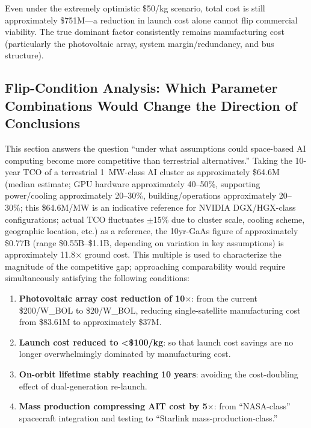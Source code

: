 Even under the extremely optimistic \$50/kg scenario, total cost is still approximately \$751M---a reduction in launch cost alone cannot flip commercial viability. The true dominant factor consistently remains manufacturing cost (particularly the photovoltaic array, system margin/redundancy, and bus structure).

\subsection{Flip-Condition Analysis: Which Parameter Combinations Would Change the Direction of Conclusions}

This section answers the question ``under what assumptions could space-based AI computing become more competitive than terrestrial alternatives.'' Taking the 10-year TCO of a terrestrial 1~MW-class AI cluster as approximately \$64.6M (median estimate; GPU hardware approximately 40--50\%, supporting power/cooling approximately 20--30\%, building/operations approximately 20--30\%; this \$64.6M/MW is an indicative reference for NVIDIA DGX/HGX-class configurations; actual TCO fluctuates $\pm$15\% due to cluster scale, cooling scheme, geographic location, etc.) as a reference, the 10yr-GaAs figure of approximately \$0.77B (range \$0.55B--\$1.1B, depending on variation in key assumptions) is approximately 11.8$\times$ ground cost. This multiple is used to characterize the magnitude of the competitive gap; approaching comparability would require simultaneously satisfying the following conditions:

\begin{enumerate}[leftmargin=*]
    \item \textbf{Photovoltaic array cost reduction of 10$\times$}: from the current \$200/W\_BOL to \$20/W\_BOL, reducing single-satellite manufacturing cost from \$83.61M to approximately \$37M.
    \item \textbf{Launch cost reduced to <\$100/kg}: so that launch cost savings are no longer overwhelmingly dominated by manufacturing cost.
    \item \textbf{On-orbit lifetime stably reaching 10 years}: avoiding the cost-doubling effect of dual-generation re-launch.
    \item \textbf{Mass production compressing AIT cost by 5$\times$}: from ``NASA-class'' spacecraft integration and testing to ``Starlink mass-production-class.''
\end{enumerate}

